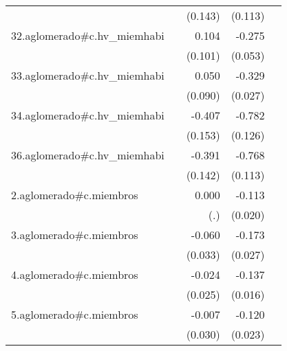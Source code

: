 {\begin{longtable}{l*{4}{D{.}{.}{-1}}}
            &                     &     (0.143)         &     (0.113)         &                     \\
\addlinespace
32.aglomerado#c.hv\_miemhabi&                     &       0.104         &      -0.275\sym{***}&                     \\
            &                     &     (0.101)         &     (0.053)         &                     \\
\addlinespace
33.aglomerado#c.hv\_miemhabi&                     &       0.050         &      -0.329\sym{***}&                     \\
            &                     &     (0.090)         &     (0.027)         &                     \\
\addlinespace
34.aglomerado#c.hv\_miemhabi&                     &      -0.407\sym{**} &      -0.782\sym{***}&                     \\
            &                     &     (0.153)         &     (0.126)         &                     \\
\addlinespace
36.aglomerado#c.hv\_miemhabi&                     &      -0.391\sym{**} &      -0.768\sym{***}&                     \\
            &                     &     (0.142)         &     (0.113)         &                     \\
\addlinespace
2.aglomerado#c.miembros&                     &       0.000         &      -0.113\sym{***}&                     \\
            &                     &         (.)         &     (0.020)         &                     \\
\addlinespace
3.aglomerado#c.miembros&                     &      -0.060         &      -0.173\sym{***}&                     \\
            &                     &     (0.033)         &     (0.027)         &                     \\
\addlinespace
4.aglomerado#c.miembros&                     &      -0.024         &      -0.137\sym{***}&                     \\
            &                     &     (0.025)         &     (0.016)         &                     \\
\addlinespace
5.aglomerado#c.miembros&                     &      -0.007         &      -0.120\sym{***}&                     \\
            &                     &     (0.030)         &     (0.023)         &                     \\

\end{longtable}}
